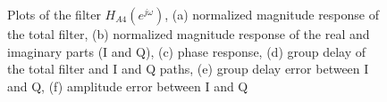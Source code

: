 \documentclass[a4paper,BCOR7mm,12pt,pointlessnumbers,bibtotoc]{scrartcl}
\begin{document}
\begin{figure}[H]
  \caption{Plots of the filter $H_{A4}(e^{j \omega})$, (a) normalized magnitude response of the total filter, (b) normalized magnitude response of the real and imaginary parts (I and Q), (c) phase response, (d) group delay of the total filter and I and Q paths, (e) group delay error between I and Q, (f) amplitude error between I and Q}
  \label{fig:h_a4}	
\end{figure}




\end{document}
